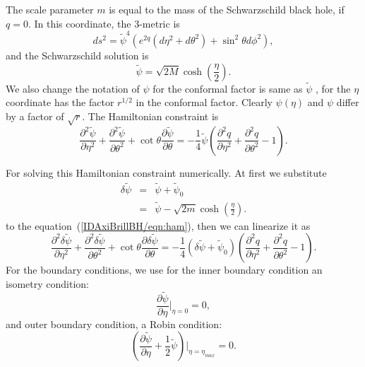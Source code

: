 \documentclass{article}
\begin{document}
The scale parameter $m$ is equal to the mass of the Schwarzschild
black hole, if $q=0$.  In this coordinate, the 3-metric is
\begin{equation}
				\label{IDAxiBrillBH/eqn:metric-brill-eta}
ds^2 = \tilde{\psi}^4 (e^{2q} (d\eta^2+d\theta^2)+\sin^2 \theta
d\phi^2),
\end{equation}
and the Schwarzschild solution is 
\begin{equation}
				\label{IDAxiBrillBH/eqn:psi}
\tilde{\psi} = \sqrt{2M} \cosh (\frac{\eta}{2}).
\end{equation}
We also change the notation of $\psi$ for the conformal factor is same 
as $\tilde{\psi}$ \cite{Camarda97a}, for the $\eta$ coordinate has the
factor $r^{1/2}$ in the conformal factor.  Clearly $\psi(\eta)$ and
$\psi$ differ by a factor of $\sqrt{r}$.  The Hamiltonian 
constraint is
\begin{equation}
				\label{IDAxiBrillBH/eqn:ham}
\frac{\partial^2 \tilde{\psi}}{\partial \eta^2} + \frac{\partial^2
  \tilde{\psi}}{\partial \theta^2} + \cot \theta \frac{\partial
  \tilde{\psi}}{\partial \theta} = - \frac{1}{4} \tilde{\psi}
(\frac{\partial^2 q}{\partial \eta^2} + \frac{\partial^2 q}{\partial
  \theta^2} -1).
\end{equation}

For solving this Hamiltonian constraint numerically.  At first
we substitute
\begin{eqnarray}
\delta \tilde{\psi} & = & \tilde{\psi}+\tilde{\psi}_0 \\
                    & = & \tilde{\psi}-\sqrt{2m} \cosh(\frac{\eta}{2}).
\end{eqnarray}
to the equation~(\ref{IDAxiBrillBH/eqn:ham}), then we can linearize it as
\begin{equation}
\frac{\partial^2 \delta\tilde{\psi}}{\partial \eta^2} + \frac{\partial^2
  \delta\tilde{\psi}}{\partial \theta^2} + \cot \theta \frac{\partial
  \delta\tilde{\psi}}{\partial \theta} = - \frac{1}{4}
(\delta\tilde{\psi} + \tilde{\psi}_0) (\frac{\partial^2 q}{\partial
  \eta^2} + \frac{\partial^2 q}{\partial \theta^2} -1).
				\label{IDAxiBrillBH/eqn:ham-linear}
\end{equation}
For the boundary conditions, we use for the inner boundary condition
an isometry condition:
\begin{equation}
\frac{\partial \tilde{\psi}}{\partial \eta}|_{\eta = 0} = 0,
				\label{IDAxiBrillBH/eqn:isometry-inner-BC}
\end{equation}
and outer boundary condition, a Robin condition:
\begin{equation}
(\frac{\partial \tilde{\psi}}{\partial \eta} + \frac{1}{2}
\tilde{\psi})|_{\eta=\eta_{max}} = 0.
\end{equation}
\end{document}
